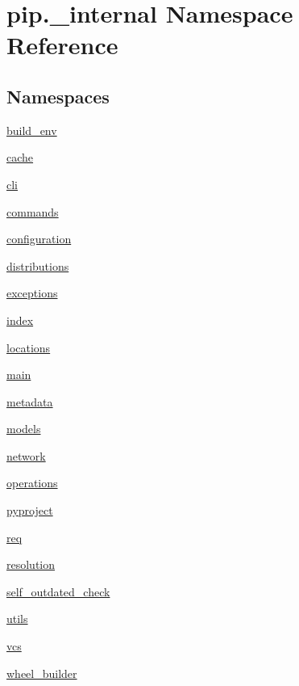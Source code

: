 \hypertarget{namespacepip_1_1__internal}{}\section{pip.\+\_\+internal Namespace Reference}
\label{namespacepip_1_1__internal}
\subsection*{Namespaces}
\begin{DoxyCompactItemize}
\item 
 \hyperlink{namespacepip_1_1__internal_1_1build__env}{build\+\_\+env}
\item 
 \hyperlink{namespacepip_1_1__internal_1_1cache}{cache}
\item 
 \hyperlink{namespacepip_1_1__internal_1_1cli}{cli}
\item 
 \hyperlink{namespacepip_1_1__internal_1_1commands}{commands}
\item 
 \hyperlink{namespacepip_1_1__internal_1_1configuration}{configuration}
\item 
 \hyperlink{namespacepip_1_1__internal_1_1distributions}{distributions}
\item 
 \hyperlink{namespacepip_1_1__internal_1_1exceptions}{exceptions}
\item 
 \hyperlink{namespacepip_1_1__internal_1_1index}{index}
\item 
 \hyperlink{namespacepip_1_1__internal_1_1locations}{locations}
\item 
 \hyperlink{namespacepip_1_1__internal_1_1main}{main}
\item 
 \hyperlink{namespacepip_1_1__internal_1_1metadata}{metadata}
\item 
 \hyperlink{namespacepip_1_1__internal_1_1models}{models}
\item 
 \hyperlink{namespacepip_1_1__internal_1_1network}{network}
\item 
 \hyperlink{namespacepip_1_1__internal_1_1operations}{operations}
\item 
 \hyperlink{namespacepip_1_1__internal_1_1pyproject}{pyproject}
\item 
 \hyperlink{namespacepip_1_1__internal_1_1req}{req}
\item 
 \hyperlink{namespacepip_1_1__internal_1_1resolution}{resolution}
\item 
 \hyperlink{namespacepip_1_1__internal_1_1self__outdated__check}{self\+\_\+outdated\+\_\+check}
\item 
 \hyperlink{namespacepip_1_1__internal_1_1utils}{utils}
\item 
 \hyperlink{namespacepip_1_1__internal_1_1vcs}{vcs}
\item 
 \hyperlink{namespacepip_1_1__internal_1_1wheel__builder}{wheel\+\_\+builder}
\end{DoxyCompactItemize}
